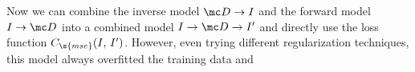 Now we can combine the inverse model $\mc D \rightarrow I$ and the forward model $I \rightarrow \mc D$ into a combined model $I \rightarrow \mc D \rightarrow I'$ and directly use the loss function $C_\s{mse}(I,\, I')$.
However, even trying different regularization techniques, this model always overfitted the training data and   